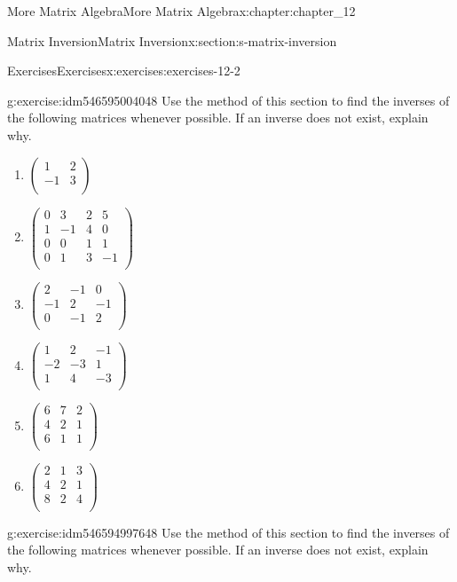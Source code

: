 \documentclass[oneside,10pt,]{book}
\numberwithin{equation}{section}
\begin{document}
\begin{chapterptx}{More Matrix Algebra}{}{More Matrix Algebra}{}{}{x:chapter:chapter_12}
\begin{sectionptx}{Matrix Inversion}{}{Matrix Inversion}{}{}{x:section:s-matrix-inversion}
\begin{exercises-subsection}{Exercises}{}{Exercises}{}{}{x:exercises:exercises-12-2}
\begin{divisionexercise}{2}{}{}{g:exercise:idm546595004048}
Use the method of this section to find the inverses of the following matrices whenever possible. If an inverse does not exist, explain why.%
\begin{multicols}{2}
\begin{enumerate}[label=(\alph*)]
\item{}\(\left(
\begin{array}{cc}
1 & 2 \\
-1 & 3 \\
\end{array}
\right)\)%
\item{}\(\left(
\begin{array}{cccc}
0 & 3 & 2 & 5 \\
1 & -1 & 4 & 0 \\
0 & 0 & 1 & 1 \\
0 & 1 & 3 & -1 \\
\end{array}
\right)\)%
\item{}\(\left(
\begin{array}{ccc}
2 & -1 & 0 \\
-1 & 2 & -1 \\
0 & -1 & 2 \\
\end{array}
\right)\)%
\item{}\(\left(
\begin{array}{ccc}
1 & 2 & -1 \\
-2 & -3 & 1 \\
1 & 4 & -3 \\
\end{array}
\right)\)%
\item{}\(\left(
\begin{array}{ccc}
6 & 7 & 2 \\
4 & 2 & 1 \\
6 & 1 & 1 \\
\end{array}
\right)\)%
\item{}\(\left(
\begin{array}{ccc}
2 & 1 & 3 \\
4 & 2 & 1 \\
8 & 2 & 4 \\
\end{array}
\right)\)%
\end{enumerate}
\end{multicols}
%
\end{divisionexercise}%
\begin{divisionexercise}{3}{}{}{g:exercise:idm546594997648}%
Use the method of this section to find the inverses of the following matrices whenever possible. If an inverse does not exist, explain why.%

\end{divisionexercise}
\end{exercises-subsection}
\end{sectionptx}
\end{chapterptx}
\end{document}
